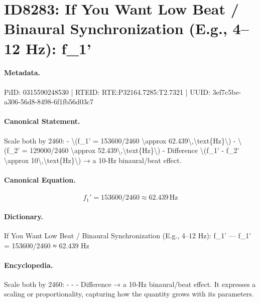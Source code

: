 \section*{ID8283: If You Want Low Beat / Binaural Synchronization (E.g., 4–12 Hz): f\_1'}
\paragraph{Metadata.}
PiID: 0315590248530 | RTEID: RTE:P32164.7285:T2.7321 | UUID: 3ef7c5be-a306-56d8-8498-6f1fb56d03c7

\paragraph{Canonical Statement.}
Scale both by 2460: - \textbackslash{}(f\_1' = 153600/2460 \textbackslash{}approx 62.439\textbackslash{},\textbackslash{}text\{Hz\}\textbackslash{}) - \textbackslash{}(f\_2' = 129000/2460 \textbackslash{}approx 52.439\textbackslash{},\textbackslash{}text\{Hz\}\textbackslash{}) - Difference \textbackslash{}(f\_1' - f\_2' \textbackslash{}approx 10\textbackslash{},\textbackslash{}text\{Hz\}\textbackslash{}) → a 10-Hz binaural/beat effect.

\paragraph{Canonical Equation.}
\[
f_1' = 153600/2460 \approx 62.439\,\text{Hz}
\]

\paragraph{Dictionary.}
If You Want Low Beat / Binaural Synchronization (E.g., 4–12 Hz): f\_1' — f\_1' = 153600/2460 ≈ 62.439 Hz

\paragraph{Encyclopedia.}
Scale both by 2460: - - - Difference → a 10-Hz binaural/beat effect. It expresses a scaling or proportionality, capturing how the quantity grows with its parameters.
